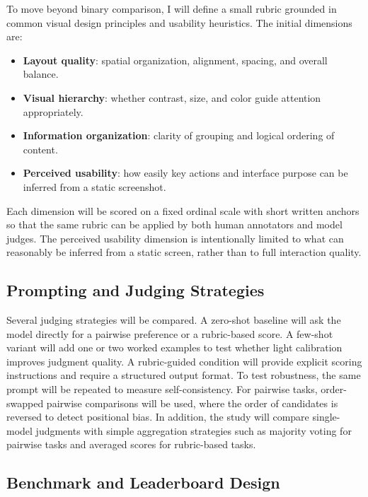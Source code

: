 \documentclass[pdflatex,sn-mathphys-num]{sn-jnl}
\begin{document}
To move beyond binary comparison, I will define a small rubric grounded in common
visual design principles and usability heuristics. The initial dimensions are:

\begin{itemize}
    \item \textbf{Layout quality}: spatial organization, alignment, spacing, and
    overall balance.
    \item \textbf{Visual hierarchy}: whether contrast, size, and color guide attention
    appropriately.
    \item \textbf{Information organization}: clarity of grouping and logical ordering
    of content.
    \item \textbf{Perceived usability}: how easily key actions and interface purpose
    can be inferred from a static screenshot.
\end{itemize}

Each dimension will be scored on a fixed ordinal scale with short written anchors so
that the same rubric can be applied by both human annotators and model judges. The
perceived usability dimension is intentionally limited to what can reasonably be
inferred from a static screen, rather than to full interaction quality.

\subsection{Prompting and Judging Strategies}

Several judging strategies will be compared. A zero-shot baseline will ask the model
directly for a pairwise preference or a rubric-based score. A few-shot variant will add
one or two worked examples to test whether light calibration improves judgment quality.
A rubric-guided condition will provide explicit scoring instructions and require a
structured output format. To test robustness, the same prompt will be repeated to
measure self-consistency. For pairwise tasks, order-swapped pairwise comparisons will
be used, where the order of candidates is reversed to detect positional bias. In
addition, the study will compare single-model judgments with simple aggregation
strategies such as majority voting for pairwise tasks and averaged scores for
rubric-based tasks.

\subsection{Benchmark and Leaderboard Design}
\end{document}
